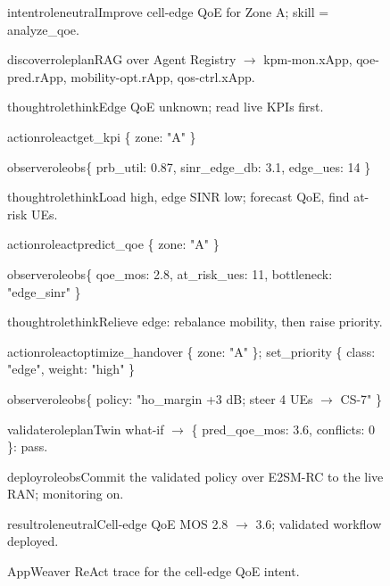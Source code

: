\documentclass[conference]{IEEEtran}
\begin{document}
\begin{figure}[htbp]
\centering
\begin{awstep}{intent}{roleneutral}Improve cell-edge QoE for Zone A; skill = analyze\_qoe.\end{awstep}
\begin{awstep}{discover}{roleplan}RAG over Agent Registry $\rightarrow$ kpm-mon.xApp, qoe-pred.rApp, mobility-opt.rApp, qos-ctrl.xApp.\end{awstep}
\begin{awstep}{thought}{rolethink}Edge QoE unknown; read live KPIs first.\end{awstep}
\begin{awstep}{action}{roleact}get\_kpi \{ zone: "A" \}\end{awstep}
\begin{awstep}{observe}{roleobs}\{ prb\_util: 0.87, sinr\_edge\_db: 3.1, edge\_ues: 14 \}\end{awstep}
\vspace{1.5pt}
\begin{awstep}{thought}{rolethink}Load high, edge SINR low; forecast QoE, find at-risk UEs.\end{awstep}
\begin{awstep}{action}{roleact}predict\_qoe \{ zone: "A" \}\end{awstep}
\begin{awstep}{observe}{roleobs}\{ qoe\_mos: 2.8, at\_risk\_ues: 11, bottleneck: "edge\_sinr" \}\end{awstep}
\vspace{1.5pt}
\begin{awstep}{thought}{rolethink}Relieve edge: rebalance mobility, then raise priority.\end{awstep}
\begin{awstep}{action}{roleact}optimize\_handover \{ zone: "A" \}; set\_priority \{ class: "edge", weight: "high" \}\end{awstep}
\begin{awstep}{observe}{roleobs}\{ policy: "ho\_margin +3 dB; steer 4 UEs $\rightarrow$ CS-7" \}\end{awstep}
\vspace{1.5pt}
\begin{awstep}{validate}{roleplan}Twin what-if $\rightarrow$ \{ pred\_qoe\_mos: 3.6, conflicts: 0 \}: pass.\end{awstep}
\begin{awstep}{deploy}{roleobs}Commit the validated policy over E2SM-RC to the live RAN; monitoring on.\end{awstep}
\begin{awstep}{result}{roleneutral}Cell-edge QoE MOS 2.8 $\rightarrow$ 3.6; validated workflow deployed.\end{awstep}
\caption{AppWeaver ReAct trace for the cell-edge QoE intent.}
\label{fig:trace}
\end{figure}
\end{document}
